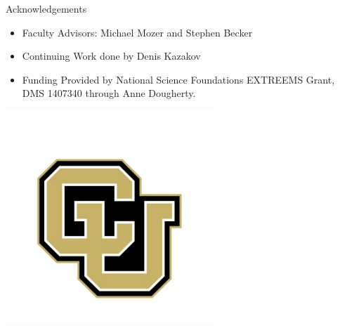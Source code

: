 \documentclass{beamer}
\begin{document}
\begin{frame}{Acknowledgements}
\begin{itemize}
    \item Faculty Advisors: Michael Mozer and Stephen Becker
\item Continuing Work done by Denis Kazakov
\item Funding Provided by National Science Foundations EXTREEMS Grant,   DMS 1407340 through Anne Dougherty.
\end{itemize}
\end{frame}
\begin{frame}
\begin{center}
\includegraphics[width=0.6\textwidth]{SkoBuffs.jpg}
\end{center}
\end{frame}

\end{document}
